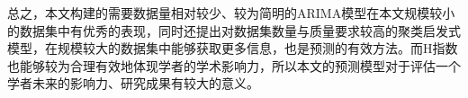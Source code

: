 \documentclass[lang=cn,11pt,a4paper,cite=authoryear]{elegantpaper}
\begin{document}
总之，本文构建的需要数据量相对较少、较为简明的ARIMA模型在本文规模较小的数据集中有优秀的表现，同时还提出对数据集数量与质量要求较高的聚类启发式模型，在规模较大的数据集中能够获取更多信息，也是预测的有效方法。而H指数也能够较为合理有效地体现学者的学术影响力，所以本文的预测模型对于评估一个学者未来的影响力、研究成果有较大的意义。

\newpage
\nocite{*}

%

\end{document}

